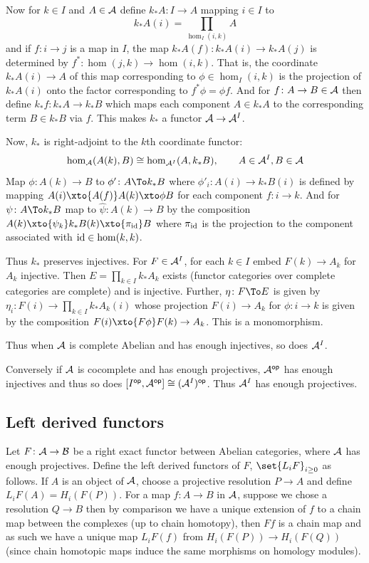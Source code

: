     Now for $k\in I$ and $A\in{{\cal A}}$ define $k_*A\colon I\to A$ mapping $i\in I$ to
    $$ k_*A(i) = \prod_{\hom_I(i,k)}A $$
    and if $f\colon i\to j$ is a map in $I$, the map $k_*A(f)\colon k_*A(i)\to k_*A(j)$ is determined by $f^*\colon\hom(j,k)\to\hom(i,k)$.
    That is, the coordinate $k_*A(i)\to A$ of this map corresponding to $\phi\in\hom_I(i,k)$ is the projection of $k_*A(i)$ onto the factor corresponding to $f^*\phi=\phi f$.
    And for $f\colon A\to B\in{{\cal A}}$ then define $k_*f\colon k_*A\to k_*B$ which maps each component $A\in k_*A$ to the corresponding term $B\in k_*B$ via $f$.
    This makes $k_*$ a functor ${{\cal A}}\to{{\cal A}}^I$.

    Now, $k_*$ is right-adjoint to the $k$th coordinate functor:
    $$ \hom_{{\cal A}}(A(k), B) \cong \hom_{{{\cal A}}^I}(A,k_*B),\qquad A\in{{\cal A}}^I,B\in{{\cal A}} $$
    Map $\phi\colon A(k)\to B$ to $\phi'\colon A\To k_*B$ where $\phi'_i\colon A(i)\to k_*B(i)$ is defined by mapping $A(i)\xto{A(f)}A(k)\xto\phi B$ for each component $f\colon i\to k$.
    And for $\psi\colon A\To k_*B$ map to $\hat\psi\colon A(k)\to B$ by the composition $A(k)\xto{\psi_k}k_*B(k)\xto{\pi_\id}B$ where $\pi_{\rm id}$ is the projection to the component associated with ${\rm id}\in\hom(k,k)$.

    Thus $k_*$ preserves injectives.
    For $F\in{{\cal A}}^I$, for each $k\in I$ embed $F(k)\to A_k$ for $A_k$ injective.
    Then $E=\prod_{k\in I}k_*A_k$ exists (functor categories over complete categories are complete) and is injective.
    Further, $\eta\colon F\To E$ is given by $\eta_i\colon F(i)\to\prod_{k\in I}k_*A_k(i)$ whose projection $F(i)\to A_k$ for $\phi\colon i\to k$ is given by the composition $F(i)\xto{F\phi}F(k)\to A_k$.
    This is a monomorphism.

    Thus when ${{\cal A}}$ is complete Abelian and has enough injectives, so does ${{\cal A}}^I$.

    Conversely if ${{\cal A}}$ is cocomplete and has enough projectives, ${{\cal A}}^{\sf op}$ has enough injectives and thus so does $[I^{\sf op},{{\cal A}}^{\sf op}]\cong({{\cal A}}^I)^{\sf op}$.
    Thus ${{\cal A}}^I$ has enough projectives.

\eexam

\subsection{Left derived functors}

\bdefn

    Let $F\colon{{\cal A}}\to{{\cal B}}$ be a right exact functor between Abelian categories, where ${{\cal A}}$ has enough projectives.
    Define the {\emphcolor left derived functors} of $F$, $\set{L_iF}_{i\geq0}$ as follows.
    If $A$ is an object of ${{\cal A}}$, choose a projective resolution $P\to A$ and define $L_iF(A)=H_i(F(P))$.
    For a map $f\colon A\to B$ in ${{\cal A}}$, suppose we chose a resolution $Q\to B$ then by comparison we have a unique extension of $f$ to a chain map between the complexes (up to chain homotopy),
    then $Ff$ is a chain map and as such we have a unique map $L_iF(f)$ from $H_i(F(P))\to H_i(F(Q))$ (since chain homotopic maps induce the same morphisms on homology modules).

